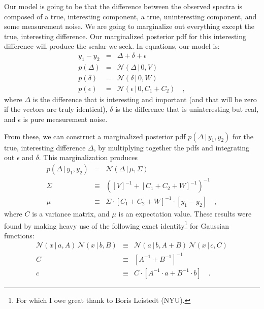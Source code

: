 \documentclass[12pt,letterpaper]{article}
\newcommand{\inv}[1]{{#1}^{-1}}
\newcommand{\given}{\,|\,}
\newcommand{\normal}{\mathcal{N}}
\begin{document}
Our model is going to be that the difference between the observed
spectra is composed of a true, interesting component, a true,
uninteresting component, and some measurement noise. We are going to
marginalize out everything except the true, interesting
difference. Our marginalized posterior pdf for this interesting
difference will produce the scalar we seek. In equations, our model is:
\begin{eqnarray}
  y_1 - y_2 &=& \Delta + \delta + \epsilon
\\
  p(\Delta) &=& \normal(\Delta\given 0,V)
\\
  p(\delta) &=& \normal(\delta\given 0,W)
\\
  p(\epsilon) &=& \normal(\epsilon\given 0,C_1+C_2)
\quad ,
\end{eqnarray}
where $\Delta$ is the difference that is interesting and important
(and that will be zero if the vectors are truly identical), $\delta$
is the difference that is uninteresting but real, and $\epsilon$ is
pure measurement noise.

From these, we can construct a marginalized posterior pdf
$p(\Delta\given y_1,y_2)$ for the true, interesting difference
$\Delta$, by multiplying together the pdfs and integrating out
$\epsilon$ and $\delta$. This marginalization produces
\begin{eqnarray}
  p(\Delta\given y_1,y_2) &=& \normal(\Delta\given\mu,\Sigma)
\\
  \Sigma &\equiv& \inv{(\inv{[V]} + \inv{[C_1 + C_2 + W]})}
\\
  \mu &\equiv& \Sigma\cdot\inv{[C_1 + C_2 + W]}\cdot[y_1-y_2]
\quad ,
\end{eqnarray}
where $C$ is a variance matrix, and $\mu$ is an expectation value.
These results were found by making heavy use of the following
exact identity\footnote{For which I owe great thank to Boris
Leistedt (NYU).} for Gaussian functions:
\begin{eqnarray}
  \normal(x\given a,A)\,\normal(x\given b,B) &\equiv& \normal(a\given b,A+B)\,\normal(x\given c,C)
\\
  C &\equiv& \inv{[\inv{A} + \inv{B}]}
\\
  c &\equiv& C\cdot [\inv{A}\cdot a + \inv{B}\cdot b]
\quad .
\end{eqnarray}
\end{document}
